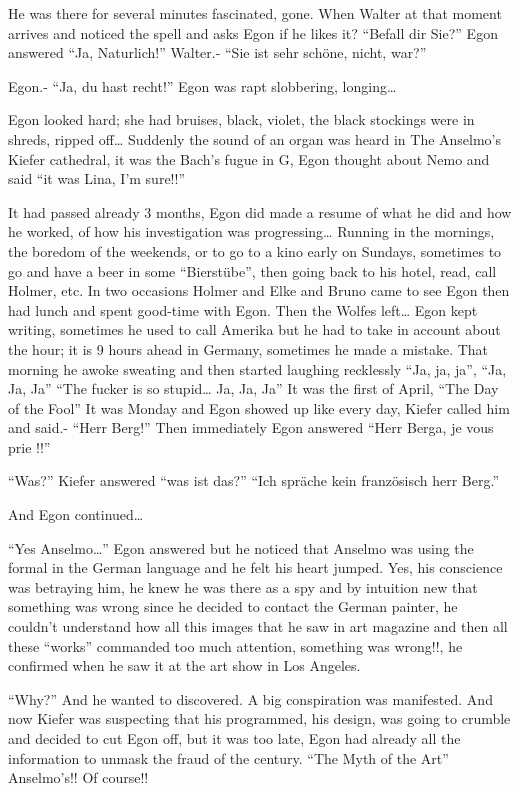 \documentclass[smalldemyvopaper,11pt,twoside,onecolumn,openright,extrafontsizes]{memoir}
\begin{document}
He was there for several minutes fascinated, gone. When Walter at that moment arrives and noticed the spell and asks Egon if he likes it? “Befall dir Sie?” Egon answered “Ja, Naturlich!” Walter.- “Sie ist sehr schöne, nicht, war?”

Egon.- “Ja, du hast recht!” Egon was rapt slobbering, longing…

Egon looked hard; she had bruises, black, violet, the black stockings were in shreds, ripped off… Suddenly the sound of an organ was heard in The Anselmo’s Kiefer cathedral, it was the Bach’s fugue in G, Egon thought about Nemo and said “it was Lina, I’m sure!!”

It had passed already 3 months, Egon did made a resume of what he did and how he worked, of how his investigation was progressing… Running in the mornings, the boredom of the weekends, or to go to a kino early on Sundays, sometimes to go and have a beer in some “Bierstübe”, then going back to his hotel, read, call Holmer, etc. In two occasions Holmer and Elke and Bruno came to see Egon then had lunch and spent good-time with Egon. Then the Wolfes left… Egon kept writing, sometimes he used to call Amerika but he had to take in account about the hour; it is 9 hours ahead in Germany, sometimes he made a mistake. That morning he awoke sweating and then started laughing recklessly “Ja, ja, ja”, “Ja, Ja, Ja” “The fucker is so stupid… Ja, Ja, Ja” It was the first of April, “The Day of the Fool” It was Monday and Egon showed up like every day, Kiefer called him and said.- “Herr Berg!” Then immediately Egon answered “Herr Berga, je vous prie !!”

“Was?” Kiefer answered “was ist das?” “Ich spräche kein französisch herr Berg.”

And Egon continued…

“Yes Anselmo…” Egon answered but he noticed that Anselmo was using the formal in the German language and he felt his heart jumped. Yes, his conscience was betraying him, he knew he was there as a spy and by intuition new that something was wrong since he decided to contact the German painter, he couldn’t understand how all this images that he saw in art magazine and then all these “works” commanded too much attention, something was wrong!!, he confirmed when he saw it at the art show in Los Angeles.

“Why?” And he wanted to discovered. A big conspiration was manifested. And now Kiefer was suspecting that his programmed, his design, was going to crumble and decided to cut Egon off, but it was too late, Egon had already all the information to unmask the fraud of the century. “The Myth of the Art” Anselmo’s!! Of course!!
\end{document}
